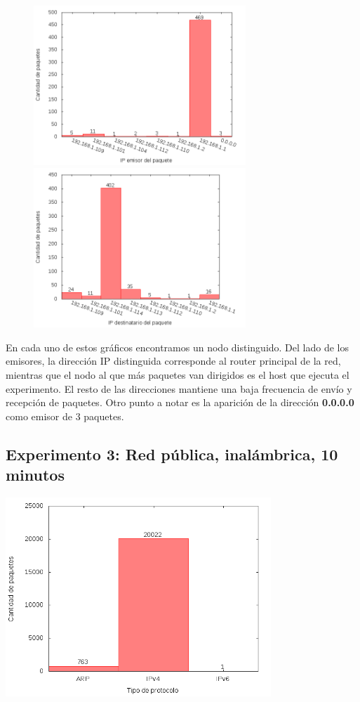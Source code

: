 \begin{figure}[!h]
\centering
\begin{minipage}{8cm}
  \centering
  \includegraphics[width=8cm]{../mediciones/home-wfi-10/home-wfi-10IpsSrcArp.png}
\end{minipage}%
\begin{minipage}{8cm}
  \centering
  \includegraphics[width=8cm]{../mediciones/home-wfi-10/home-wfi-10IpsDstArp.png}
\end{minipage}
\end{figure}

En cada uno de estos gráficos encontramos un nodo distinguido. Del lado de los emisores, la dirección IP distinguida corresponde al
router principal de la red, mientras que el nodo al que más paquetes van dirigidos es el host que ejecuta el experimento. El resto
de las direcciones mantiene una baja frecuencia de envío y recepción de paquetes. Otro punto a notar es la aparición de la dirección
\textbf{0.0.0.0} como emisor de 3 paquetes.

\subsection{Experimento 3: Red pública, inalámbrica, 10 minutos}

\includegraphics[width=10cm]{../mediciones/altop-wifi-10/altop10Protocolos.png}

